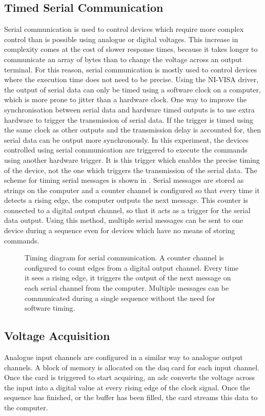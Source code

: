 \subsection{Timed Serial Communication}\label{subsec:compinterface_serial}
Serial communication is used to control devices which require more complex
control than is possible using analogue or digital voltages. This increase in
complexity comes at the cost of slower response times, because it takes
longer to communicate an array of bytes than to change the voltage
across an output terminal. For this reason, serial communication is
mostly used to control devices where the execution time does not need
to be precise. Using the NI-VISA driver, the output of serial
data can only be timed using a software clock on a computer, which is more
prone to jitter than a hardware clock. One way to improve the synchronisation
between serial data and hardware timed outputs is to use extra hardware to
trigger the transmission of serial data. If the trigger is timed using the
same clock as other outputs and the transmission delay is accounted for, then
serial data can be output more synchronously. In this experiment, the
devices controlled using serial communication are triggered to execute
the commands using another hardware trigger. It is this trigger which
enables the precise timing of the device, not the one which triggers
the transmission of the serial data. The scheme for timing serial
messages is shown in . Serial messages are
stored as strings on the computer and a counter channel is configured so that
every time it detects a rising edge, the computer outputs the next message.
This counter is connected to a digital output channel, so that it acts as a
trigger for the serial data output. Using this method, multiple serial
messages can be sent to one device during a sequence even for devices which
have no means of storing commands.
\begin{figure}[!htbp]
    \centering
    
    \caption[Timing diagram for serial communication]{Timing diagram for
    serial communication. A counter channel is configured to count edges from
    a digital output channel. Every time it sees a rising edge, it triggers
    the output of the next message on each serial channel from the computer.
    Multiple messages can be communicated during a single sequence without
    the need for software timing.}\label{fig:serial_timing}
\end{figure} 
\subsection{Voltage Acquisition}\label{subsec:compinterface_mmacquisition}
Analogue input channels are configured in a similar way to analogue output
channels. A block of memory is allocated on the \ac{daq} card for each input
channel. Once the card is triggered to start acquiring, an \ac{adc} converts
the voltage across the input into a digital value at every rising edge of the
clock signal. Once the sequence has finished, or the buffer has been filled,
the card streams this data to the computer.

